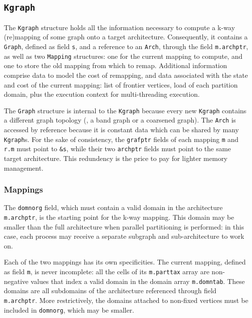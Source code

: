 \subsection{\texttt{Kgraph}}
\label{sec-data-kgraph}

The \texttt{Kgraph} structure holds all the information necessary to
compute a k-way (re)mapping of some graph onto a target architecture.
Consequently, it contains a \texttt{Graph}, defined as field
\texttt{s}, and a reference to an \texttt{Arch}, through the field
\texttt{m.archptr}, as well as two \texttt{Mapping} structures: one
for the current mapping to compute, and one to store the old mapping
from which to remap. Additional information comprise data to model the
cost of remapping, and data associated with the state and cost of the
current mapping: list of frontier vertices, load of each partition
domain, plus the execution context for multi-threading execution.

The \texttt{Graph} structure is internal to the \texttt{Kgraph}
because every new \texttt{Kgraph} contains a different graph topology
(\eg, a band graph or a coarsened graph). The \texttt{Arch} is
accessed by reference because it is constant data which can be shared
by many \texttt{Kgraph}s. For the sake of consistency, the
\texttt{grafptr} fields of each mapping \texttt{m} and \texttt{r.m}
must point to \texttt{\&s}, while their two \texttt{archptr} fields
must point to the same target architecture. This redundency is the
price to pay for lighter memory management.

\subsubsection{Mappings}

The \texttt{domnorg} field, which must contain a valid domain in the
architecture \texttt{m.archptr}, is the starting point for the k-way
mapping. This domain may be smaller than the full architecture when
parallel partitioning is performed: in this case, each process may
receive a separate subgraph and sub-architecture to work on.

Each of the two mappings has its own specificities. The current
mapping, defined as field \texttt{m}, is never incomplete: all the
cells of its \texttt{m.parttax} array are non-negative values that index
a valid domain in the domain array \texttt{m.domntab}. These domains
are all subdomains of the architecture referenced through field
\texttt{m.archptr}. More restrictively, the domains attached to
non-fixed vertices must be included in \texttt{domnorg}, which may be
smaller.

